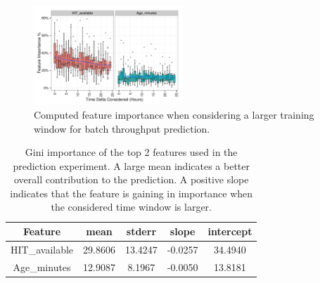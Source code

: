 \begin{figure}[t!]
	\centering
		\includegraphics[width=0.5\textwidth]{figures/importances}
	\caption{Computed feature importance when considering a larger training window for batch throughput prediction.}
	\label{fig:importances}
\end{figure}

\begin{table}[t!]
\begin{center}
\scriptsize
\caption {Gini importance of the top 2 features used in the prediction experiment. A large mean indicates a better overall contribution to the prediction. A positive slope indicates that the feature is gaining in importance when the considered time window is larger.}
\begin{tabular}{|c|c|c|c|c|}
\hline
Feature              & mean      & stderr    & slope     & intercept \\
\hline
HIT\_available      & 29.8606 & 13.4247 & -0.0257 & 34.4940 \\
Age\_minutes           & 12.9087 &  8.1967 & -0.0050 & 13.8181 \\

\end{tabular}
\end{center}
\end{table}
